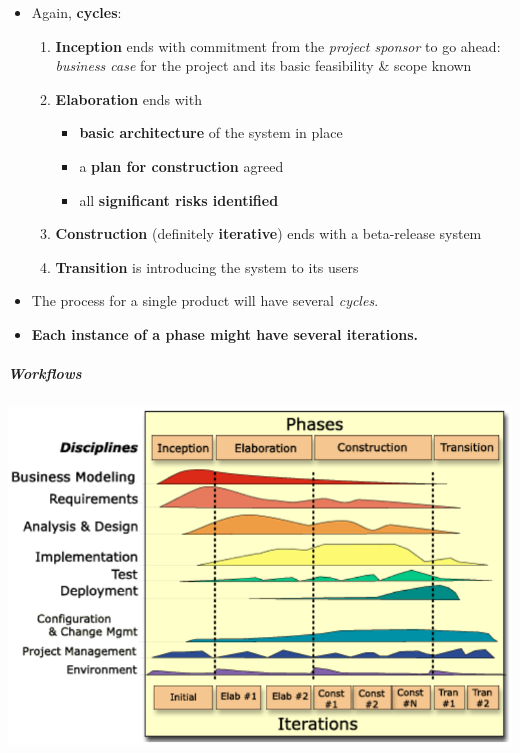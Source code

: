 \documentclass[a4paper]{article}
\providecommand{\tightlist}{%
  \setlength{\itemsep}{0pt}\setlength{\parskip}{0pt}}
\let\oldsubparagraph\subparagraph
\renewcommand{\subparagraph}[1]{\oldsubparagraph{#1}\mbox{}}
\begin{document}
\begin{itemize}
\tightlist
\item
  Again, \textbf{cycles}:

  \begin{enumerate}
  \def\labelenumi{\arabic{enumi}.}
  \tightlist
  \item
    \textbf{Inception} ends with commitment from the \emph{project
    sponsor} to go ahead: \emph{business case} for the project and its
    basic feasibility \& scope known
  \item
    \textbf{Elaboration} ends with

    \begin{itemize}
    \tightlist
    \item
      \textbf{basic architecture} of the system in place
    \item
      a \textbf{plan for construction} agreed
    \item
      all \textbf{significant risks identified}
    \end{itemize}
  \item
    \textbf{Construction} (definitely \textbf{iterative}) ends with a
    beta-release system
  \item
    \textbf{Transition} is introducing the system to its users
  \end{enumerate}
\item
  The process for a single product will have several \emph{cycles}.
\item
  \textbf{Each instance of a phase might have several iterations.}
\end{itemize}

\hypertarget{workflows}{%
\subparagraph{Workflows}\label{workflows}}

\includegraphics{2C-SE.assets/1543144642816.png}
\end{document}
